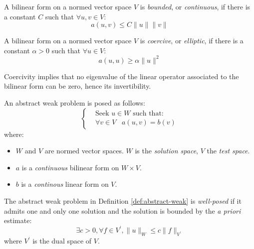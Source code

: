 \begin{defin}[Continuity]\label{def:continuity}
  A bilinear form on a normed vector space $V$ is \emph{bounded}, or
  \emph{continuous}, if there is a constant $C$ such that
  $\forall u, v \in V$:
  \[
  a(u, v) \leq C\lVert u\rVert\lVert v\rVert
  \]
\end{defin}

\begin{defin}[Coercivity]\label{def:coercivity}
  A bilinear form on a normed vector space $V$ is \emph{coercive},
  or \emph{elliptic}, if there is a constant $\alpha >0$ such that
  $\forall u \in V$:
  \[
  a(u, u) \geq \alpha\lVert u\rVert^2
  \]
\end{defin}
Coercivity implies that no eigenvalue of the linear operator associated to the
bilinear form can be zero, hence its invertibility.\autocite{Ern2004-oo}

\begin{defin}\label{def:abstract-weak}
An abstract weak problem is posed as follows:
\begin{equation}
  \left\{
  \begin{aligned}
    &\text{Seek $u \in W$ such that:}\\
    &\forall v \in V \,\,\,\,\,
    a(u, v) = b(v)
  \end{aligned}
  \right.
  \label{eq:weak}
\end{equation}
where:
\begin{itemize}
  \item $W$ and $V$ are normed vector spaces. $W$ is the \emph{solution space},
  $V$ the \emph{test space}.
  \item $a$ is a \emph{continuous} bilinear form on $W \times V$.
  \item $b$ is a \emph{continous} linear form on $V$.
\end{itemize}
\end{defin}

\begin{defin}\label{def:hadamard}
The abstract weak problem in Definition \ref{def:abstract-weak} is
\emph{well-posed} if it admits one and only one solution and the solution is
bounded by the \emph{a priori} estimate:
\begin{equation}
\exists c > 0, \forall f \in V^\prime, \|u\|_W \leq c \|f\|_{V^\prime}
\end{equation}
where $V^\prime$ is the dual space of $V$.
\end{defin}

